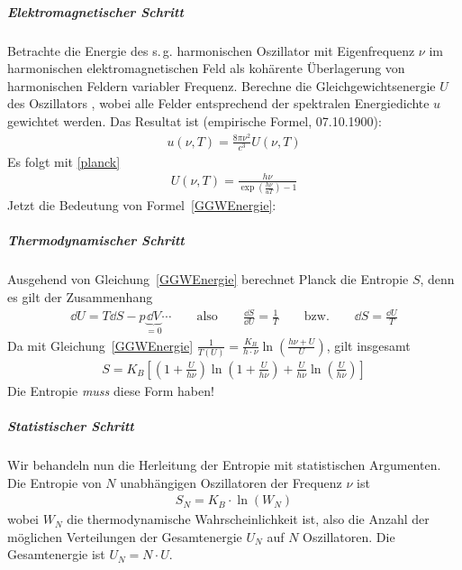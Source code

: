
\subparagraph{Elektromagnetischer Schritt}
Betrachte die Energie des s.\,g. harmonischen Oszillator mit
Eigenfrequenz $\nu$ im harmonischen elektromagnetischen Feld
als kohärente Überlagerung von harmonischen Feldern variabler
Frequenz.
Berechne die Gleichgewichtsenergie $U$ des Oszillators%
, wobei
alle Felder entsprechend der spektralen Energiedichte $u$ gewichtet
werden.
Das Resultat ist (empirische Formel, 07.10.1900):
\begin{gather*}
  u(\nu, T) = \frac{8\pi\nu^2}{c^3} U(\nu, T)
\end{gather*}
Es folgt mit \eqref{planck}
\begin{gather}
  U(\nu, T) = \frac{h\nu}{\exp(\frac{h\nu}{uT}) - 1}
  \label{GGWEnergie}
\end{gather}
Jetzt die Bedeutung von Formel~\eqref{GGWEnergie}:

\subparagraph{Thermodynamischer Schritt}
Ausgehend von Gleichung~\eqref{GGWEnergie} berechnet Planck die
Entropie $S$, denn es gilt der Zusammenhang
\begin{gather*}
  \dd U = T\dd S - p\underbrace{\dd V}_{=0} \dotsb
  \qquad\text{also} \qquad
  \frac{\dd S}{\dd U} = \frac{1}{T}
  \qquad\text{bzw.} \qquad
  \dd S = \frac{\dd U}{T} 
\end{gather*}
Da mit Gleichung~\eqref{GGWEnergie}
$\frac{1}{T(U)} = \frac{K_B}{h\cdot\nu}\ln\left(\frac{h\nu+U}{U}\right)$,
gilt insgesamt
\begin{gather*}
  S = K_B \left[ 
    \left(1+\frac{U}{h\nu}\right) \ln\left(1+\frac{U}{h\nu}\right)
    + \frac{U}{h\nu}\ln\left(\frac{U}{h\nu}\right)
  \right]
\end{gather*}
Die Entropie \emph{muss} diese Form haben!

\subparagraph{Statistischer Schritt}
Wir behandeln nun die Herleitung der Entropie mit statistischen
Argumenten.
Die Entropie von $N$ unabhängigen Oszillatoren der Frequenz $\nu$
ist
\begin{gather*}
  S_N = K_B\cdot \ln(W_N)
\end{gather*}
wobei $W_N$
die thermodynamische Wahrscheinlichkeit ist, also die Anzahl der
möglichen Verteilungen der Gesamtenergie $U_N$ auf $N$ Oszillatoren.
Die Gesamtenergie ist $U_N=N\cdot
U$.

